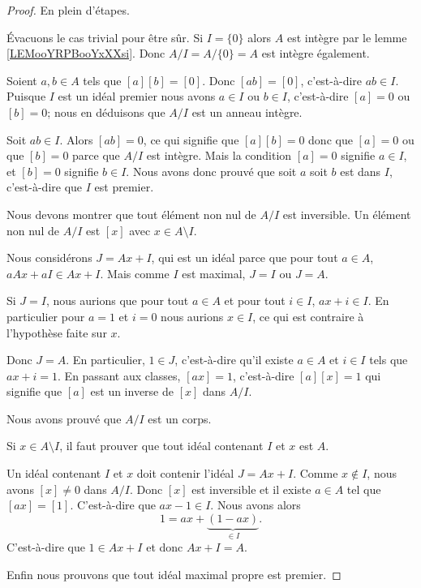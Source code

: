 \begin{proof}
	En plein d'étapes.
	\begin{subproof}
        \spitem[\ref{ITEMooUGBTooOGrnWl}, \( \Rightarrow\)]
		Évacuons le cas trivial pour être sûr. Si \( I=\{ 0 \}\) alors \( A\) est intègre par le lemme \ref{LEMooYRPBooYxXXsi}. Donc \( A/I=A/\{ 0 \}=A\) est intègre également.

		Soient \( a,b\in A\) tels que \( [a][b]=[0]\). Donc \( [ab]=[0]\), c'est-à-dire \( ab\in I\). Puisque \( I\) est un idéal premier nous avons \( a\in I\) ou \( b\in I\), c'est-à-dire \( [a]=0\) ou \( [b]=0\); nous en déduisons que \( A/I\) est un anneau intègre.
        \spitem[\ref{ITEMooUGBTooOGrnWl}, \( \Leftarrow\)]

		Soit \( ab\in I\). Alors \( [ab]=0\), ce qui signifie que \( [a][b]=0\) donc que \( [a]=0\) ou que \( [b]=0\) parce que \( A/I\) est intègre. Mais la condition \( [a]=0\) signifie \( a\in I\), et \( [b]=0\) signifie \( b\in I\). Nous avons donc prouvé que soit \( a\) soit \( b\) est dans \( I\), c'est-à-dire que \( I\) est premier.
        \spitem[\ref{ITEMooGLXSooUjINqR}, \( \Rightarrow\)]

		Nous devons montrer que tout élément non nul de \( A/I\) est inversible. Un élément non nul de \( A/I\) est \( [x]\) avec \( x\in A\setminus I\).

		Nous considérons \( J=Ax+I\), qui est un idéal parce que pour tout \( a\in A\), \( aAx+aI\in Ax+I\). Mais comme \( I\) est maximal, \( J=I\) ou \( J=A\).

		Si \( J=I\), nous aurions que pour tout \( a\in A\) et pour tout \( i\in I\), \( ax+i\in I\). En particulier pour \( a=1\) et \( i=0\) nous aurions \( x\in I\), ce qui est contraire à l'hypothèse faite sur \( x\).

		Donc \( J=A\). En particulier, \( 1\in J\), c'est-à-dire qu'il existe \( a\in A\) et \( i\in I\) tels que \( ax+i=1\). En passant aux classes, \( [ax]=1\), c'est-à-dire \( [a][x]=1\) qui signifie que \( [a]\) est un inverse de \( [x]\) dans \( A/I\).

        Nous avons prouvé que \( A/I\) est un corps.

        \spitem[\ref{ITEMooGLXSooUjINqR}, \( \Leftarrow\)]
		Si \( x\in A\setminus I\), il faut prouver que tout idéal contenant \( I\) et \( x\) est \( A\).

		Un idéal contenant \( I\) et \( x\) doit contenir l'idéal \( J=Ax+I\). Comme \( x\notin I\), nous avons \( [x]\neq 0\) dans \( A/I\). Donc \( [x] \) est inversible et il existe \( a\in A\) tel que \( [ax]=[1]\). C'est-à-dire que \( ax-1\in I\). Nous avons alors
		\begin{equation}
			1=ax+\underbrace{(1-ax)}_{\in I}.
		\end{equation}
		C'est-à-dire que \( 1\in Ax+I\) et donc \( Ax+I=A\).
	\end{subproof}
	Enfin nous prouvons que tout idéal maximal propre est premier.


\end{proof}
